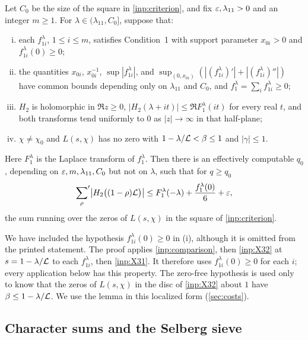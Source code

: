 \begin{inp}\label{inp:envelope}
Let $C_0$ be the size of the square in \cref{inp:criterion}, and fix
$\varepsilon,\lambda_{11}>0$ and an integer $m\ge1$. For $\lambda\in(\lambda_{11},C_0]$, suppose that:
\begin{enumerate}[(i)]
  \item each $f^\lambda_{1i}$, $1\le i\le m$, satisfies Condition~1 with support parameter
    $x_{0i}>0$ and $f^\lambda_{1i}(0)\ge0$;
  \item the quantities $x_{0i}$, $x_{0i}^{-1}$, $\sup|f^\lambda_{1i}|$, and
    $\sup_{(0,x_{0i})}(|(f^\lambda_{1i})'|+|(f^\lambda_{1i})''|)$ have common bounds depending
    only on $\lambda_{11}$ and $C_0$, and $f_1^\lambda=\sum_i f^\lambda_{1i}\ge0$;
  \item $H_2$ is holomorphic in $\Re z\ge0$,
    $|H_2(\lambda+it)|\le\Re F_1^\lambda(it)$ for every real $t$, and both transforms tend
    uniformly to $0$ as $|z|\to\infty$ in that half-plane;
  \item $\chi\ne\chi_0$ and $L(s,\chi)$ has no zero with
    $1-\lambda/\mathcal{L}<\beta\le1$ and $|\gamma|\le1$.
\end{enumerate}
Here $F_1^\lambda$ is the Laplace transform of $f_1^\lambda$.
Then there is an effectively computable $q_0$,
depending on $\varepsilon,m,\lambda_{11},C_0$ but not on $\lambda$, such that for $q\ge q_0$
\[
  {\sum_\rho}'\bigl|H_2\bigl((1-\rho)\mathcal{L}\bigr)\bigr|\le F_1^\lambda(-\lambda)+\frac{f_1^\lambda(0)}6+\varepsilon,
\]
the sum running over the zeros of $L(s,\chi)$ in the square of \cref{inp:criterion}.
\end{inp}

We have included the hypothesis $f^\lambda_{1i}(0)\ge0$ in (i), although it is omitted
from the printed statement. The proof \cite[pp.~35--36]{Xylouris2011nullstellen} applies \cref{inp:comparison}, then
\cref{inp:X32} at $s=1-\lambda/\mathcal{L}$ to each $f^\lambda_{1i}$, then \cref{inp:X31}. It therefore uses
$f^\lambda_{1i}(0)\ge0$ for each $i$; every application below has this property.
The zero-free hypothesis is used only to know
that the zeros of $L(s,\chi)$ in the disc of \cref{inp:X32} about $1$ have $\beta\le1-\lambda/\mathcal{L}$.
We use the lemma in this localized form (\cref{sec:costs}).

\subsection{Character sums and the Selberg sieve}

